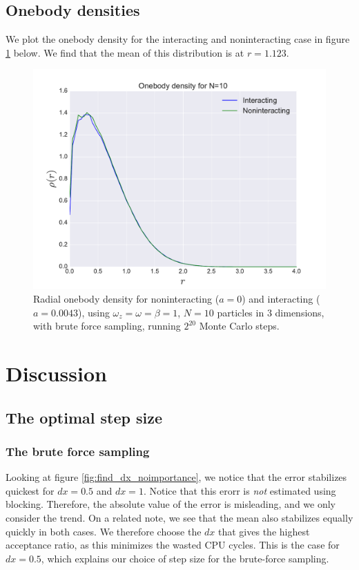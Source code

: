 \documentclass[a4paper, 10pt]{article}
\begin{document}
	\subsection{Onebody densities}
	We plot the onebody density for the interacting and noninteracting case in figure \ref{fig:results_onebody} below. We find that the mean of this distribution is at $r=1.123$.
		\begin{figure}[ht!]
			\centering
			\includegraphics[scale=0.8]{../Results/onbody.pdf}
			\caption{Radial onebody density for noninteracting ($a=0$) and interacting ($a=0.0043$), using $\omega_z=\omega=\beta=1$, $N=10$ particles in $3$ dimensions, with brute force sampling, running $2^{20}$ Monte Carlo steps.}\label{fig:results_onebody}
		\end{figure}
	\section{Discussion}
	\subsection{The optimal step size}
	\subsubsection{The brute force sampling}\label{sec:Disc_optimal_step_size_brute_force}
	Looking at figure \ref{fig:find_dx_noimportance}, we notice that the error stabilizes quickest for $dx=0.5$ and $dx=1$. Notice that this erorr is \textit{not} estimated using blocking. Therefore, the absolute value of the error is misleading, and we only consider the trend. On a related note, we see that the mean also stabilizes equally quickly in both cases. We therefore choose the $dx$ that gives the highest acceptance ratio, as this minimizes the wasted CPU cycles. This is the case for $dx=0.5$, which explains our choice of step size for the brute-force sampling.
\end{document}
